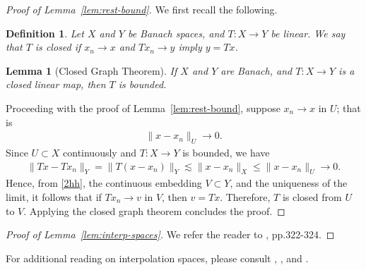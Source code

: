 \documentclass[12pt,reqno]{amsart}
\numberwithin{equation}{section}  %
\numberwithin{figure}{section}
\newtheorem{lemma}[theorem]{Lemma}
\newtheorem{definition}[theorem]{Definition}
\begin{document}
\begin{proof}[Proof of Lemma~\ref{lem:rest-bound}]
We first recall the following.
\begin{definition}
Let $X$ and $Y$ be Banach spaces, and $T: X \to Y$ be linear. We say that $T$ is
\emph{closed} if 
%
%
%
$x_{n} \to x$ and $Tx_{n} \to y$ imply $y = Tx$. 
\end{definition}

%
%
%
%
%
%
%
%
\begin{lemma}[Closed Graph Theorem]
\label{lem:closed-graph}
If $X$ and $Y$ are Banach, and $T: X \to Y$ is a closed linear map, then $T$ is
bounded.
\end{lemma}
%
%
Proceeding with the proof of Lemma~\ref{lem:rest-bound},
suppose $x_{n} \to x$ in $U$; that is
%
%
\begin{equation}
  \label{1hh}
\begin{split}
  \| x - x_{n} \|_{U} \to 0.
\end{split}
\end{equation}
%
%
Since $U \subset X$
continuously and
$T: X \to Y$ is bounded, we have
%
%
\begin{equation}
  \label{2hh}
\begin{split}
  \| Tx - Tx_{n} \|_{Y} = \| T(x - x_{n}) \|_{Y} \lesssim \| x -
  x_{n} \|_{X} \le  \| x - x_{n} \|_{U} \to 0.
\end{split}
\end{equation}
%
%
Hence, from \eqref{2hh}, the continuous embedding $V \subset Y$, 
and the uniqueness of the limit,
it follows that if $Tx_{n} \to v$ in $V$, then $v = Tx$. 
Therefore, $T$ is closed from
$U$ to $V$. Applying the closed graph theorem concludes the proof. 
\end{proof}
%
%
%
\begin{proof}[Proof of Lemma~\ref{lem:interp-spaces}]
  We refer the reader to \cite{Taylor:1995kx}, pp.322-324.
\end{proof}
%
%
For additional reading on interpolation spaces, please consult
\cite{Taylor:1995kx}, \cite{bergh1976interpolation}, and \cite{Bennett:1988ys}.
%
%
\end{document}
